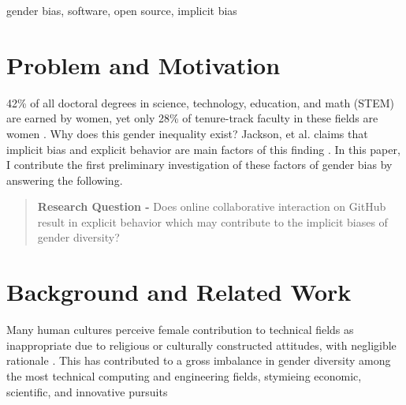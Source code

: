 \documentclass{sigplanconf}
\begin{document}
\keywords
gender bias, software, open source, implicit bias


\section{Problem and Motivation}

42\% of all doctoral degrees in science, technology, education, and
math (STEM) are earned by women, yet only 28\% of tenure-track faculty in these
fields are women \citep{womenengineering}. Why does this gender inequality exist?
Jackson, et al. claims that implicit bias and explicit behavior are main
factors of this finding \cite{implicitbias}. In this paper, I
contribute the first preliminary investigation of these factors of gender bias
by answering the following.

\begin{quote}
  \textbf{Research Question -} Does online collaborative interaction on GitHub result in
  explicit behavior which may contribute to the implicit biases of gender diversity?
\end{quote}

\section{Background and Related Work}

Many human cultures perceive female contribution to technical
fields as inappropriate due to religious or culturally constructed attitudes, with
negligible rationale \citep{elamin2010saudiwomen}. This has contributed to a gross imbalance in gender diversity among
the most technical computing and engineering fields, stymieing economic,
scientific, and innovative pursuits \citep{genderscience}
\end{document}
